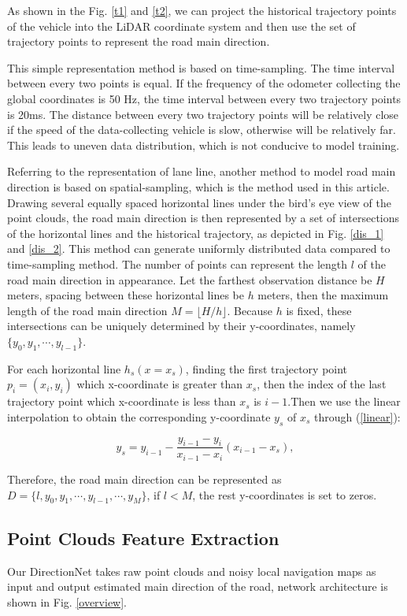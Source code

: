 \documentclass[letterpaper,10 pt,conference]{ieeeconf}  %
\begin{document}
As shown in the Fig. \ref{t1} and \ref{t2}, we can project the historical trajectory points of the vehicle into the LiDAR coordinate system and then use the set of trajectory points to represent the road main direction.

This simple representation method is based on time-sampling. The time interval between every two points is equal. If the frequency of the odometer collecting the global coordinates is 50 Hz, the time interval between every two trajectory points is 20ms. The distance between every two trajectory points will be relatively close if the speed of the data-collecting vehicle is slow, otherwise will be relatively far. This leads to uneven data distribution, which is not conducive to model training.

Referring to the representation of lane line\cite{33}, another method to model road main direction is based on spatial-sampling, which is the method used in this article. Drawing several equally spaced horizontal lines under the bird's eye view of the point clouds, the road main direction is then represented by a set of intersections of the horizontal lines and the historical trajectory, as depicted in Fig. \ref{dis_1} and \ref{dis_2}. This method can generate uniformly distributed data compared to time-sampling method. The number of points can represent the length $l$ of the road main direction in appearance. Let the farthest observation distance be $H$ meters, spacing between these horizontal lines be $h$ meters, then the maximum length of the road main direction $M=\lfloor H/h \rfloor$. Because $h$ is fixed, these intersections can be uniquely determined by their y-coordinates, namely$\{y_0, y_1, \cdots, y_{l-1}\}$. 

For each horizontal line $h_s(x=x_s)$, finding the first trajectory point $p_i=(x_i, y_i)$ which x-coordinate is greater than $x_s$, then the index of the last trajectory point which x-coordinate is less than $x_s$ is $i-1$.Then we use the linear interpolation to obtain the corresponding y-coordinate $y_s$ of $x_s$ through (\ref{linear}):

\begin{equation} \label{linear}
    y_s = y_{i-1}-\frac{y_{i-1}-y_i}{x_{i-1}-x_i}(x_{i-1}-x_s), 
\end{equation}

Therefore, the road main direction can be represented as $D=\{l, y_0, y_1, \cdots, y_{l-1}, \cdots, y_M\}$, if $l<M$, the rest y-coordinates is set to zeros.

\subsection{Point Clouds Feature Extraction}
Our DirectionNet takes raw point clouds and noisy local navigation maps as input and output estimated main direction of the road, network architecture is shown in Fig. \ref{overview}.
\end{document}
